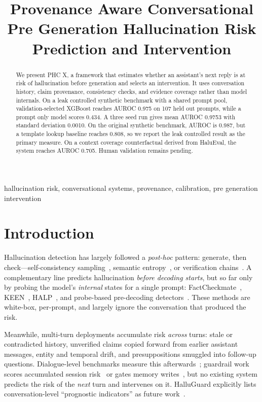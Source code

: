 \documentclass[conference,a4paper]{IEEEtran}
\title{Provenance Aware Conversational Pre Generation Hallucination Risk Prediction and Intervention}
\author{\IEEEauthorblockN{Arya D, Jeswanth G, N Sai Baba}
\IEEEauthorblockA{Capstone Project\\
Affiliation and contact details to be completed}}
\begin{document}
\maketitle

\begin{abstract}
We present PHC X, a framework that estimates whether an assistant's next
reply is at risk of hallucination before generation and selects an
intervention. It uses conversation history, claim provenance, consistency
checks, and evidence coverage rather than model internals. On a leak
controlled synthetic benchmark with a shared prompt pool, validation-selected
XGBoost reaches AUROC 0.975 on 107 held out prompts, while a prompt only
model scores 0.434. A three seed run gives mean AUROC 0.9753 with standard
deviation 0.0010. On
the original synthetic benchmark, AUROC is 0.987, but a template lookup
baseline reaches 0.808, so we report the leak controlled result as the
primary measure. On a context coverage counterfactual derived from HaluEval,
the system reaches AUROC 0.705. Human validation remains pending.
\end{abstract}

\begin{IEEEkeywords}
hallucination risk, conversational systems, provenance, calibration,
pre generation intervention
\end{IEEEkeywords}


\section{Introduction}
Hallucination detection has largely followed a \emph{post-hoc} pattern:
generate, then check---self-consistency sampling~\cite{selfcheckgpt},
semantic entropy~\cite{kuhn2023}, or verification chains~\cite{cove}.
A complementary line predicts hallucination \emph{before decoding starts},
but so far only by probing the model's \emph{internal} states for a single
prompt: FactCheckmate~\cite{factcheckmate}, KEEN~\cite{keen},
HALP~\cite{halp}, and probe-based pre-decoding
detectors~\cite{miftakhova2026,hallutracer}. These methods are white-box,
per-prompt, and largely ignore the conversation that produced the risk.

Meanwhile, multi-turn deployments accumulate risk \emph{across} turns:
stale or contradicted history, unverified claims copied forward from earlier
assistant messages, entity and temporal drift, and presuppositions smuggled
into follow-up questions. Dialogue-level benchmarks measure this
afterwards~\cite{dihalu,halluhard}; guardrail work scores accumulated
session risk~\cite{statefulguardrails} or gates memory
writes~\cite{consistencygate}, but no existing system predicts the risk of
the \emph{next} turn and intervenes on it. HalluGuard explicitly lists
conversation-level ``prognostic indicators'' as future work~\cite{hallugarid}.
\end{document}
